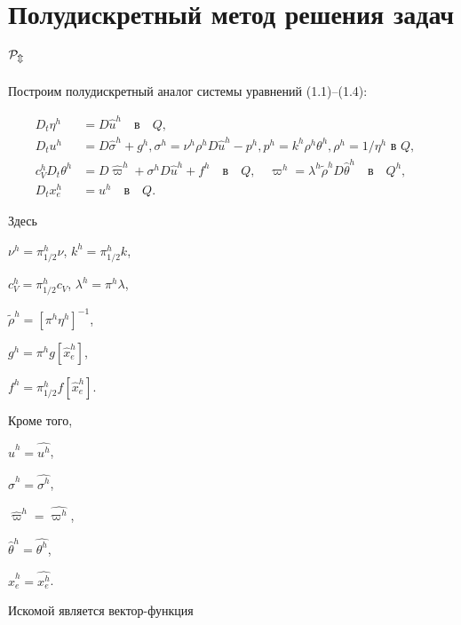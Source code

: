 \documentclass[12pt]{article}
\theoremstyle{plain} %
\theoremstyle{definition}
\numberwithin{equation}{section}
\begin{document}
\section{Полудискретный метод решения задач $\cal P_m$}





Построим полудискретный аналог системы уравнений (1.1)--(1.4):


\begin{align}


D_t\eta^h &= D\widehat u^h\quad\text{в}\quad Q,\\


%


D_t u^h &= D\widehat\sigma^h + g^h,


\sigma^h = \nu^h\rho^h D\widehat u^h - p^h,


p^h=k^h\rho^h\theta^h, \rho^h=1/\eta^h\text{ в }Q,\quad\\


%


c_V^h D_t\theta^h &= D\widehat\varpi^h +


\sigma^h D\widehat u^h + f^h\quad\text{в}\quad Q,\quad


\varpi^h = \lambda^h \widetilde\rho^h D\widehat\theta^h


\quad\text{в}\quad Q^h,\\


%


D_tx^h_e &= u^h\quad\text{в}\quad Q.


\end{align}


Здесь


$\nu^h=\pi^h_{1/2}\nu$, $k^h = \pi^h_{1/2}k$,


$c_V^h=\pi^h_{1/2}c_V$, $\lambda^h = \pi^h\lambda$,


$\widetilde\rho^h=[\pi^h\eta^h]^{-1}$,


$g^h=\pi^h g[\widehat x_e^h]$,


$f^h = \pi^h_{1/2}f[\widehat x^h_e]$.


Кроме того,


$\widehat u^h=\widehat{u^h}$,


$\widehat \sigma^h=\widehat{\sigma^h}$,


$\widehat \varpi^h=\widehat{\varpi^h}$,


$\widehat\theta^h=\widehat{\theta^h}$,


$\widehat x_e^h=\widehat{x_e^h}$.


Искомой является вектор-функция
\end{document}
